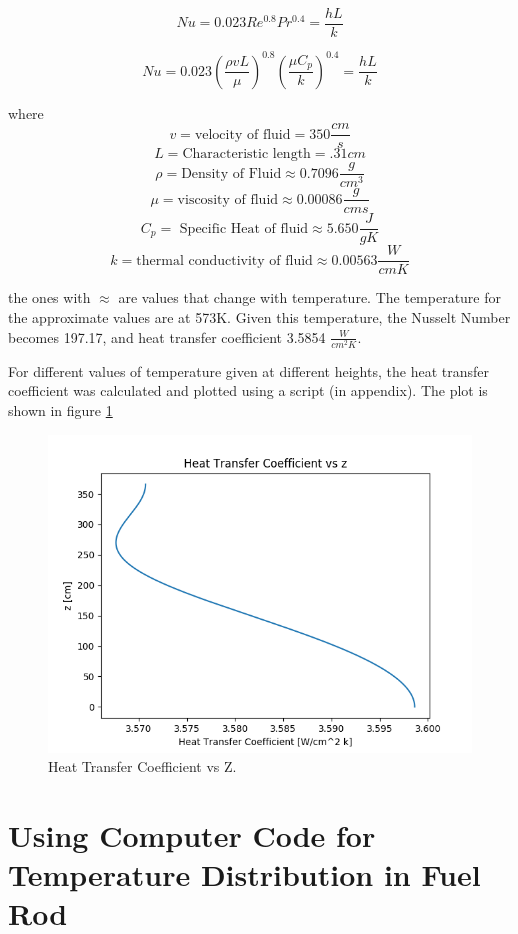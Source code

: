 \documentclass[12pt,letterpaper]{article}
\begin{document}
\[ Nu = 0.023 Re^{0.8} Pr^{0.4} = \frac{h L}{k}\]

\[ Nu = 0.023 (\frac{\rho v L}{\mu})^{0.8} (\frac{\mu C_p}{k})^{0.4} = \frac{h L}{k}\]

where
\[v = \text{velocity of fluid} = 350 \frac{cm}{s}\]
\[L = \text{Characteristic length} = .31 cm \]
\[\rho = \text{Density of Fluid} \approx 0.7096 \frac{g}{cm^3}\]
\[\mu = \text{viscosity of fluid} \approx 0.00086 \frac{g}{cm s}\]
\[C_p = \text{ Specific Heat of fluid} \approx 5.650 \frac{J}{g K} \]
\[k = \text{thermal conductivity of fluid} \approx 0.00563\frac{W}{cm K} \]

the ones with $\approx$ are values that change with temperature. The temperature
for the approximate values are at 573K. Given this temperature, the Nusselt Number 
becomes 197.17, and heat transfer coefficient 3.5854 $\frac{W}{cm^2 K}$.

For different values of temperature given at different heights, the heat
transfer coefficient was calculated and plotted using a script (in appendix).
The plot is shown in figure \ref{fig:h_z}

\begin{figure}[htbp!]
    \begin{center}
        \includegraphics[scale=0.7]{h_z.png}
    \end{center}
    \caption{Heat Transfer Coefficient vs Z.}
    \label{fig:h_z}
\end{figure}

\section*{Using Computer Code for Temperature Distribution in Fuel Rod}
\end{document}
